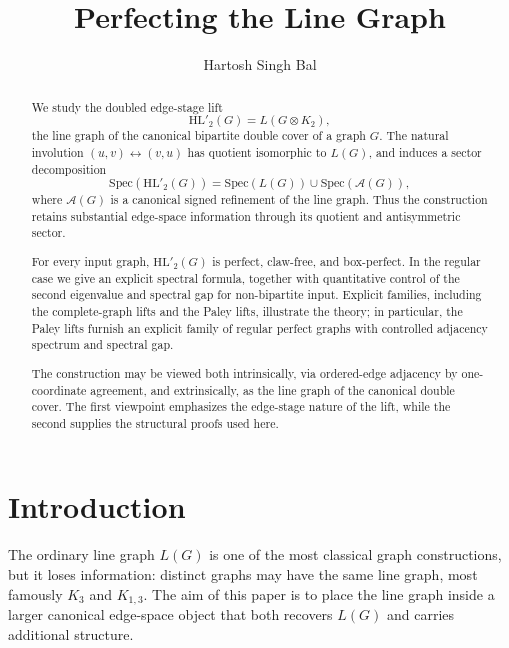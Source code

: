 \documentclass[11pt]{article}
\newcommand{\Spec}{\mathrm{Spec}}
\newcommand{\HL}{\mathrm{HL}}
\theoremstyle{plain}
\begin{document}
\title{Perfecting the Line Graph}
\author{Hartosh Singh Bal}
\date{}





\maketitle
\renewcommand{\thefootnote}{}
\renewcommand{\thefootnote}{\arabic{footnote}}

\begin{abstract}
We study the doubled edge-stage lift
\[
\HL'_2(G)=L(G\otimes K_2),
\]
the line graph of the canonical bipartite double cover of a graph \(G\). The natural involution
\((u,v)\leftrightarrow(v,u)\) has quotient isomorphic to \(L(G)\), and induces a sector decomposition
\[
\Spec(\HL'_2(G))=\Spec(L(G))\cup\Spec(\mathcal A(G)),
\]
where \(\mathcal A(G)\) is a canonical signed refinement of the line graph. Thus the construction retains
substantial edge-space information through its quotient and antisymmetric sector.

For every input graph, \(\HL'_2(G)\) is perfect, claw-free, and box-perfect. In the regular case we give an
explicit spectral formula, together with quantitative control of the second eigenvalue and spectral gap for
non-bipartite input. Explicit families, including the complete-graph lifts and the Paley lifts, illustrate the
theory; in particular, the Paley lifts furnish an explicit family of regular perfect graphs with controlled
adjacency spectrum and spectral gap.

The construction may be viewed both intrinsically, via ordered-edge adjacency by one-coordinate agreement, and
extrinsically, as the line graph of the canonical double cover. The first viewpoint emphasizes the edge-stage
nature of the lift, while the second supplies the structural proofs used here.
\end{abstract}

\section{Introduction}

The ordinary line graph \(L(G)\) is one of the most classical graph constructions, but it loses information:
distinct graphs may have the same line graph, most famously \(K_3\) and \(K_{1,3}\). The aim of this paper is
to place the line graph inside a larger canonical edge-space object that both recovers \(L(G)\) and carries
additional structure.
\end{document}
